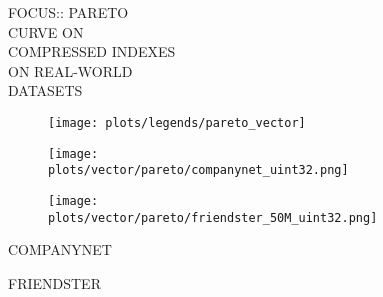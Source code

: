 \documentclass{article}
\begin{document}
\begin{figure}[!htbp]
\fbox
{
\begin{minipage}[t][0.98\textheight][t]{\textwidth}
\centering
    \begin{minipage}{0.23\linewidth}
    \footnotesize{FOCUS::  PARETO\\ CURVE ON \\ COMPRESSED INDEXES \\ ON REAL-WORLD \\ DATASETS}
    \end{minipage}
   \begin{minipage}{0.75\linewidth}
        \begin{figure}[H]
        \texttt{[image: plots/legends/pareto\_vector]}
        \end{figure}
    \end{minipage}
    \vfill

   \begin{minipage}{0.48\linewidth}
        \begin{figure}[H]
        \texttt{[image: plots/vector/pareto/companynet\_uint32.png]}
        \end{figure}
    \end{minipage}
    \begin{minipage}{0.48\linewidth}
        \begin{figure}[H]
        \texttt{[image: plots/vector/pareto/friendster\_50M\_uint32.png]}
        \end{figure}
    \end{minipage}
    \begin{minipage}{0.48\linewidth}
    \begin{center}
        COMPANYNET
    \end{center}
    \end{minipage}
    \begin{minipage}{0.48\linewidth}
    \begin{center}
        FRIENDSTER
    \end{center}
    \end{minipage}

    \vfill


\end{minipage}}
\end{figure}
\end{document}
